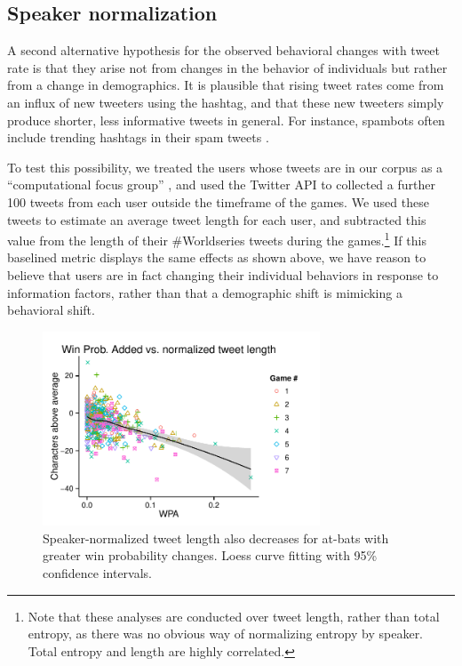 \documentclass[11pt,letterpaper]{article}
\begin{document}
\subsection{Speaker normalization}
\label{sect:speaker-normalization}

A second alternative hypothesis for the observed behavioral changes with tweet rate is that they arise not from changes in the behavior of individuals but rather from a change in demographics.  It is plausible that rising tweet rates come from an influx of new tweeters using the hashtag, and that these new tweeters simply produce shorter, less informative tweets in general.  For instance, spambots often include trending hashtags in their spam tweets \cite{martinez2013}. 

To test this possibility, we treated the users whose tweets are in our corpus as a ``computational focus group'' \cite{lin2013,lin2014}, and used the Twitter API to collected a further 100 tweets from each user outside the timeframe of the games.  We used these tweets to estimate an average tweet length for each user, and subtracted this value from the length of their \#Worldseries tweets during the games.\footnote{Note that these analyses are conducted over tweet length, rather than total entropy, as there was no obvious way of normalizing entropy by speaker. Total entropy and length are highly correlated.} If this baselined metric displays the same effects as shown above, we have reason to believe that users are in fact changing their individual behaviors in response to information factors, rather than that a demographic shift is mimicking a behavioral shift.

\begin{figure}
 \centering
  \includegraphics[width=3.25in]{figures/fig4.pdf}
 \caption{Speaker-normalized tweet length also decreases for at-bats with greater win probability changes. Loess curve fitting with 95\% confidence intervals.}\label{fig:wpa-ld-agg}\vspace*{-.5em}
\end{figure}
\end{document}
